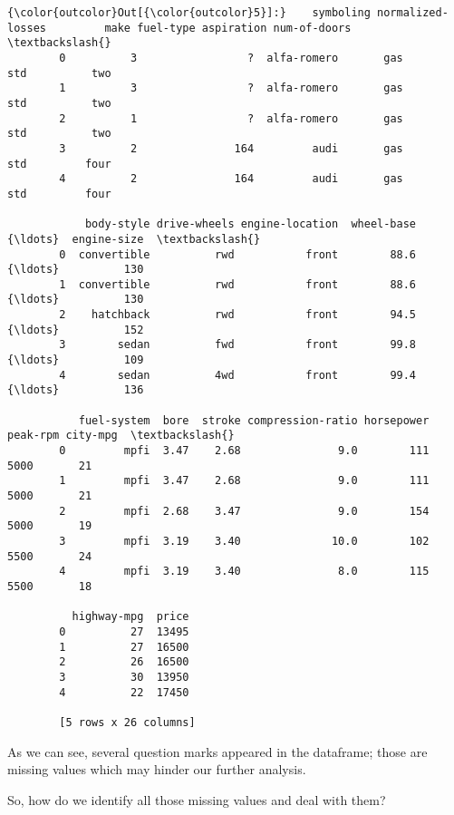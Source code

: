 \documentclass[11pt]{article}
\begin{document}
\begin{Verbatim}[commandchars=\\\{\}]
{\color{outcolor}Out[{\color{outcolor}5}]:}    symboling normalized-losses         make fuel-type aspiration num-of-doors  \textbackslash{}
        0          3                 ?  alfa-romero       gas        std          two   
        1          3                 ?  alfa-romero       gas        std          two   
        2          1                 ?  alfa-romero       gas        std          two   
        3          2               164         audi       gas        std         four   
        4          2               164         audi       gas        std         four   
        
            body-style drive-wheels engine-location  wheel-base  {\ldots}  engine-size  \textbackslash{}
        0  convertible          rwd           front        88.6  {\ldots}          130   
        1  convertible          rwd           front        88.6  {\ldots}          130   
        2    hatchback          rwd           front        94.5  {\ldots}          152   
        3        sedan          fwd           front        99.8  {\ldots}          109   
        4        sedan          4wd           front        99.4  {\ldots}          136   
        
           fuel-system  bore  stroke compression-ratio horsepower  peak-rpm city-mpg  \textbackslash{}
        0         mpfi  3.47    2.68               9.0        111      5000       21   
        1         mpfi  3.47    2.68               9.0        111      5000       21   
        2         mpfi  2.68    3.47               9.0        154      5000       19   
        3         mpfi  3.19    3.40              10.0        102      5500       24   
        4         mpfi  3.19    3.40               8.0        115      5500       18   
        
          highway-mpg  price  
        0          27  13495  
        1          27  16500  
        2          26  16500  
        3          30  13950  
        4          22  17450  
        
        [5 rows x 26 columns]
\end{Verbatim}
            
    As we can see, several question marks appeared in the dataframe; those
are missing values which may hinder our further analysis.

So, how do we identify all those missing values and deal with them?
\end{document}
